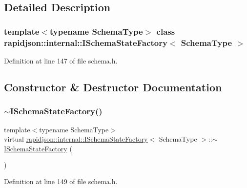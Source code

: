\subsection{Detailed Description}
\subsubsection*{template$<$typename Schema\+Type$>$\newline
class rapidjson\+::internal\+::\+I\+Schema\+State\+Factory$<$ Schema\+Type $>$}



Definition at line 147 of file schema.\+h.



\subsection{Constructor \& Destructor Documentation}
\mbox{\label{classrapidjson_1_1internal_1_1_i_schema_state_factory_a2f91d2ea192049dd2087a73768f55934}} 
\subsubsection{\texorpdfstring{$\sim$ISchemaStateFactory()}{~ISchemaStateFactory()}}
{\footnotesize\ttfamily template$<$typename Schema\+Type$>$ \\
virtual \mbox{\hyperlink{classrapidjson_1_1internal_1_1_i_schema_state_factory}{rapidjson\+::internal\+::\+I\+Schema\+State\+Factory}}$<$ Schema\+Type $>$\+::$\sim$\mbox{\hyperlink{classrapidjson_1_1internal_1_1_i_schema_state_factory}{I\+Schema\+State\+Factory}} (\begin{DoxyParamCaption}{ }\end{DoxyParamCaption})\hspace{0.3cm}{\ttfamily [virtual]}}



Definition at line 149 of file schema.\+h.


\begin{DoxyCode}{0}

\end{DoxyCode}


